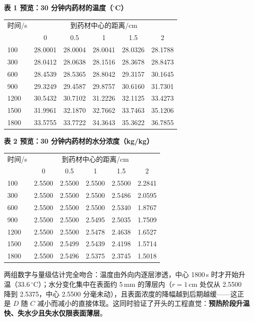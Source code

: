 \documentclass[12pt,a4paper]{ctexart}
\begin{document}
\begin{center}
\textbf{表 1 预览：30 分钟内药材的温度（$^\circ$C）}
\begin{tabular}{lccccc}
\toprule
时间/s & \multicolumn{5}{c}{到药材中心的距离/cm} \\
 & 0 & 0.5 & 1 & 1.5 & 2 \\
\midrule
100 & 28.0001 & 28.0004 & 28.0041 & 28.0326 & 28.1788 \\
300 & 28.0412 & 28.0638 & 28.1516 & 28.3678 & 28.8473 \\
600 & 28.4539 & 28.5365 & 28.8042 & 29.3157 & 30.1645 \\
900 & 29.3249 & 29.4587 & 29.8757 & 30.6160 & 31.7301 \\
1200 & 30.5432 & 30.7102 & 31.2226 & 32.1125 & 33.4273 \\
1500 & 31.9961 & 32.1870 & 32.7662 & 33.7463 & 35.1206 \\
1800 & 33.5755 & 33.7722 & 34.3643 & 35.3622 & 36.7855 \\
\bottomrule
\end{tabular}
\end{center}

\begin{center}
\textbf{表 2 预览：30 分钟内药材的水分浓度（kg/kg）}
\begin{tabular}{lccccc}
\toprule
时间/s & \multicolumn{5}{c}{到药材中心的距离/cm} \\
 & 0 & 0.5 & 1 & 1.5 & 2 \\
\midrule
100 & 2.5500 & 2.5500 & 2.5500 & 2.5500 & 2.2841 \\
300 & 2.5500 & 2.5500 & 2.5500 & 2.5486 & 2.0595 \\
600 & 2.5500 & 2.5500 & 2.5500 & 2.5340 & 1.8767 \\
900 & 2.5500 & 2.5500 & 2.5495 & 2.5035 & 1.7509 \\
1200 & 2.5500 & 2.5500 & 2.5478 & 2.4638 & 1.6527 \\
1500 & 2.5500 & 2.5499 & 2.5439 & 2.4198 & 1.5714 \\
1800 & 2.5500 & 2.5496 & 2.5375 & 2.3745 & 1.5018 \\
\bottomrule
\end{tabular}
\end{center}

两组数字与量级估计完全吻合：温度由外向内逐层渗透，中心 1800\,s 时才开始升温（33.6\,$^\circ$C）；水分变化集中在表面约 5\,mm 的薄层内（$r=1$\,cm 处仅从 2.5500 降到 2.5375，中心 2.5500 分毫未动），且表面浓度的降幅越到后期越缓——这正是 $D$ 随 $C$ 减小而减小的直接体现。这同时验证了开头的工程直觉：\textbf{预热阶段升温快、失水少且失水仅限表面薄层}。
\end{document}

